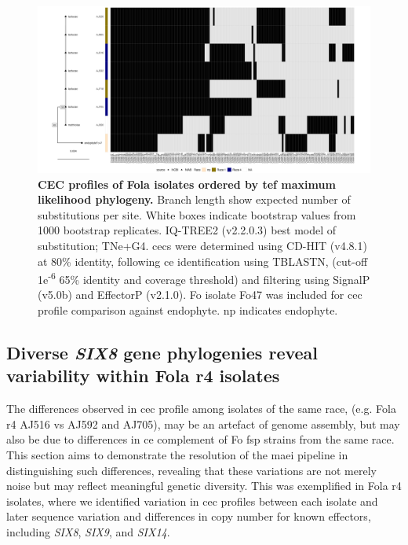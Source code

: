 \begin{figure}
    \centering
    \includegraphics[width=\textwidth]{Figures/HeatmapAndPhylo_LactucaeOnly.png}
    \captionsetup{width=24cm}
    \caption[CEC profiles of \ac{Fola} isolates ordered by \ac{tef} maximum likelihood phylogeny.]{\textbf{CEC profiles of \ac{Fola} isolates ordered by \ac{tef} maximum likelihood phylogeny.}  Branch length show expected number of substitutions per site. White boxes indicate bootstrap values from 1000 bootstrap replicates. IQ-TREE2 (v2.2.0.3) best model of substitution; TNe+G4. \Acp{cec} were determined using CD-HIT (v4.8.1) at 80\% identity, following \ac{ce} identification using TBLASTN, (cut-off 1e\textsuperscript{-6} 65\% identity and coverage threshold) and filtering using SignalP (v5.0b) and EffectorP (v2.1.0). \ac{Fo} isolate Fo47 was included for \ac{cec} profile comparison against endophyte. np indicates endophyte.}
    \label{fig:MaeiHeatmap-lettuce}
\end{figure}

\subsection{Diverse \textit{SIX8} gene phylogenies reveal variability within \acl{Fola} \acl{r4} isolates}

The differences observed in \ac{cec} profile among isolates of the same race, (e.g. \ac{Fola} \ac{r4} AJ516 vs AJ592 and AJ705), may be an artefact of genome assembly, but may also be due to differences in \ac{ce} complement of \ac{Fo} \ac{fsp} strains from the same race. This section aims to demonstrate the resolution of the \ac{maei} pipeline in distinguishing such differences, revealing that these variations are not merely noise but may reflect meaningful genetic diversity. This was exemplified in \ac{Fola} \ac{r4} isolates, where we identified variation in \ac{cec} profiles between each isolate and later sequence variation and differences in copy number for known effectors, including \textit{SIX8}, \textit{SIX9}, and \textit{SIX14}.

